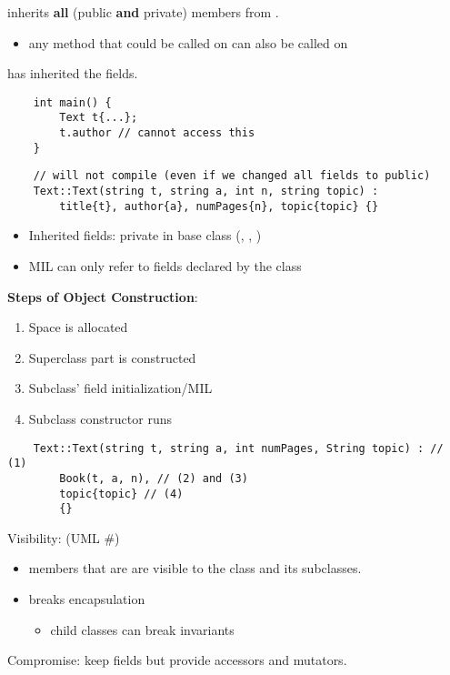  inherits \textbf{all} (public \textbf{and} private)
members from .
\begin{itemize}
    \item any method that could be called on  can also
          be called on 
\end{itemize}
 has inherited the  fields.
\begin{lstlisting}
    int main() {
        Text t{...};
        t.author // cannot access this
    }
\end{lstlisting}

\begin{lstlisting}
    // will not compile (even if we changed all fields to public)
    Text::Text(string t, string a, int n, string topic) :
        title{t}, author{a}, numPages{n}, topic{topic} {}
\end{lstlisting}
\begin{itemize}
    \item Inherited fields: private in base class (, ,
          )
    \item MIL can only refer to fields declared by the class
\end{itemize}

\textbf{Steps of Object Construction}:
\begin{enumerate}[label=(\arabic*)]
    \item Space is allocated
    \item Superclass part is constructed
    \item Subclass' field initialization/MIL
    \item Subclass constructor runs
\end{enumerate}

\begin{lstlisting}
    Text::Text(string t, string a, int numPages, String topic) : // (1)
        Book(t, a, n), // (2) and (3)
        topic{topic} // (4)
        {}
\end{lstlisting}

Visibility:  (UML \#)
\begin{itemize}
    \item members that are  are visible to the class
          and its subclasses.
    \item breaks encapsulation
          \begin{itemize}
              \item child classes can break invariants
          \end{itemize}
\end{itemize}
Compromise: keep fields  but provide 
accessors and mutators.


